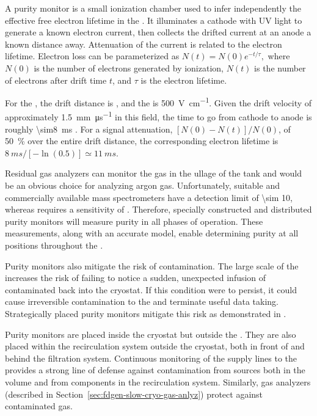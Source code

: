 A purity monitor is a small ionization chamber used to infer independently  the effective free electron lifetime in the .  
It illuminates a cathode with UV light to generate a known electron current, then collects the drifted current at an anode a known distance away.  Attenuation of the current is related to the electron lifetime.
Electron loss can be parameterized as
%
\(N(t) = N(0)e^{-t/\tau},\)
%
where $N(0)$ is the number of electrons generated by ionization, $N(t)$ is the number of electrons after drift time $t$, and $\tau$ is the electron lifetime. 

For the , the drift distance is \dpmaxdrift, and the \efield is \SI{500}{\volt\per\centi\meter}. Given the drift velocity of approximately \SI{1.5}{\milli\meter\per\micro\second} in this field, the time to go from cathode to anode is roughly \SI{\sim8}{\milli\second} \cite{Walkowiak:2000wf}.
For a  signal attenuation, \([N(0)-N(t)]/N(0)\), of \SI{50}{\percent} over the entire drift distance,
 the corresponding electron lifetime is $\SI{8}{ms}/[-\ln(0.5)] \simeq \SI{11}{ms}$.

Residual gas analyzers can monitor the gas in the ullage of the tank and would be an obvious choice for analyzing argon gas. 
Unfortunately, suitable and commercially available mass
spectrometers have a detection limit of \SI{\sim 10}{},
whereas  requires a sensitivity of . Therefore,
specially constructed and distributed purity monitors will measure \lar purity in all %
phases of operation. %
These measurements,
along with an accurate  model, enable 
determining  purity at all positions throughout the .


Purity monitors also %
mitigate the risk of \lar contamination.  The large scale of the  increases the risk of failing to notice a sudden, unexpected infusion of contaminated \lar %
back into the cryostat.   
If this condition were to persist, it could cause irreversible contamination to the  and terminate useful data taking.  Strategically placed purity monitors mitigate this risk as demonstrated in . 

Purity monitors are placed inside the cryostat but outside the %
. They are also placed  within the recirculation system outside the cryostat, both in front of and behind the filtration system. %
Continuous monitoring of  the \lar supply lines to the  provides a strong line of defense against %
contamination from sources both in the \lar volume and from components in the recirculation system. 
Similarly, gas analyzers (described in Section~\ref{sec:fdgen-slow-cryo-gas-anlyz}) %
protect against contaminated gas.  

